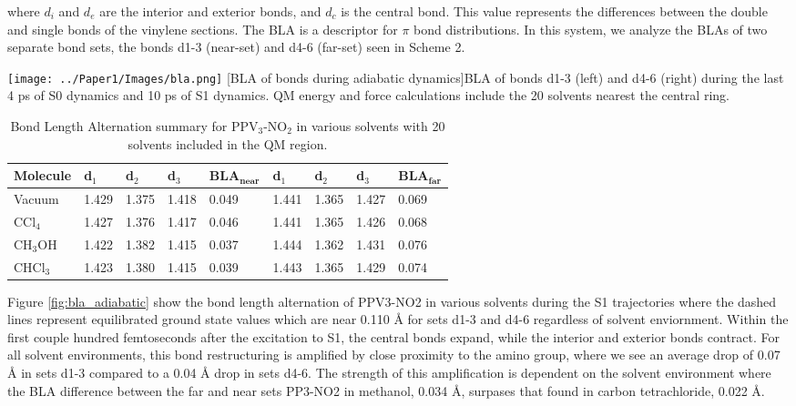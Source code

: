 	where \(d_i\) and \(d_e\) are the interior and exterior bonds, and \(d_c\) is the central bond.
	This value represents the differences between the double and single bonds of the vinylene sections.
	The BLA is a descriptor for \(\pi\) bond distributions. \cite{tretiak2002conformational}
	In this system, we analyze the BLAs of two separate bond sets, the bonds d1-3 (near-set) and d4-6 (far-set) seen in Scheme 2. 

	\noindent
	\begin{minipage}[c]{\textwidth} 
	  \centering
	  \texttt{[image: ../Paper1/Images/bla.png]}
	  [BLA of bonds during adiabatic dynamics]{BLA of bonds d1-3 (left) and d4-6 (right) during the last 4 ps of S0 dynamics and 10 ps of S1 dynamics.
	    QM energy and force calculations include the 20 solvents nearest the central ring.}
	  \label{fig:bla_adiabatic}
	\end{minipage}\bigskip



\begin{table}[H]
  \caption[Adiabatic Bond Length Alternation]{Bond Length Alternation summary for PPV\(_3\)-NO\(_2\) in various solvents with 20 solvents included in the QM region.}
  \begin{tabularx}{\textwidth}{XXXXXXXXX}\hline
    Molecule   & d\(_1\)  & d\(_2\) & d\(_3\) & BLA\(_{\textbf{near}}\) & d\(_1\)  & d\(_2\) & d\(_3\) & BLA\(_{\textbf{far}}\)\\\hline
    Vacuum     & 1.429     & 1.375    & 1.418    & 0.049              & 1.441     & 1.365    & 1.427   & 0.069\\
    CCl\(_4\)  & 1.427     & 1.376    & 1.417    & 0.046              & 1.441     & 1.365    & 1.426   & 0.068\\
    CH\(_3\)OH & 1.422     & 1.382    & 1.415    & 0.037              & 1.444     & 1.362    & 1.431   & 0.076\\
    CHCl\(_3\) & 1.423     & 1.380    & 1.415    & 0.039              & 1.443     & 1.365    & 1.429   & 0.074\\\hline
  \end{tabularx}
\end{table}


	Figure \ref{fig:bla_adiabatic} show the bond length alternation of PPV3-NO2 in various solvents during the S1 trajectories where the dashed lines represent equilibrated ground state values which are near 0.110 Å for sets d1-3 and d4-6 regardless of solvent enviornment.
	Within the first couple hundred femtoseconds after the excitation to S1, the central bonds expand, while the interior and exterior bonds contract.
	For all solvent environments, this bond restructuring is amplified by close proximity to the amino group, where we see an average drop of 0.07 Å in sets d1-3 compared to a 0.04 Å drop in sets d4-6.
	The strength of this amplification is dependent on the solvent environment where the BLA difference between the far and near sets PP3-NO2 in methanol, 0.034 Å, surpases that found in carbon tetrachloride, 0.022 Å.

